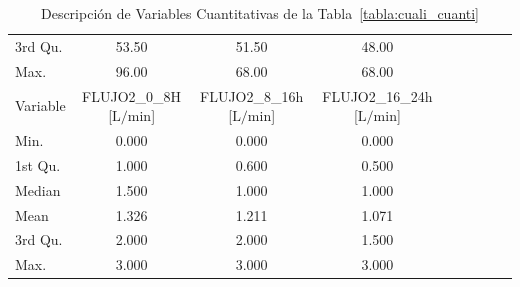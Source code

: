 \begin{landscape}
\begin{table}[h]
\begin{tabular}{lcccccccc}
        3rd Qu. & 53.50 & 51.50 & 48.00 \\
        Max. & 96.00 & 68.00 & 68.00 \\ \hline
        Variable & FLUJO2\_0\_8H [$ \text{L/min} $] & FLUJO2\_8\_16h [$ \text{L/min} $] & FLUJO2\_16\_24h [$ \text{L/min} $] \\ \hline
        Min. & 0.000 & 0.000 & 0.000 \\
        1st Qu. & 1.000 & 0.600 & 0.500 \\
        Median & 1.500 & 1.000 & 1.000 \\
        Mean & 1.326 & 1.211 & 1.071 \\
        3rd Qu. & 2.000 & 2.000 & 1.500 \\
        Max. & 3.000 & 3.000 & 3.000  \\ \hline
        \end{tabular}
        \caption{Descripción de Variables Cuantitativas de la Tabla~\ref{tabla:cuali_cuanti}}
        \label{tab:datos_descripcion_cuantitativos}
    \end{table}
\end{landscape}
\restoregeometry 
    
